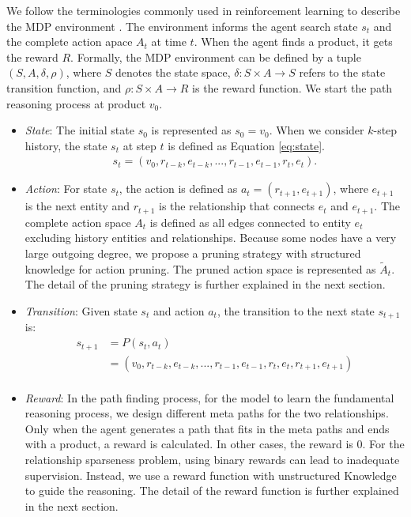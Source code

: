 \documentclass[review]{elsarticle}
\begin{document}
\begin{sloppypar}
We follow the terminologies commonly used in reinforcement learning to describe the MDP environment \cite{shani2005_mdp}.
The environment informs the agent search state $s_{t}$ and the complete action apace $A_{t}$ at time $t$.
When the agent finds a product, it gets the reward $R$. 
Formally, the MDP environment can be defined by a tuple $(S, A, \delta, \rho)$, where $S$ denotes the state space, $\delta:S \times A \rightarrow S$ refers to the state transition function, and $\rho: S \times A \rightarrow R$ is the reward function. We start the path reasoning process at product $v_{0}$.
\begin{itemize}
\item \emph{State}: The initial state $s_{0}$ is represented as $s_{0}=v_{0}$. When we consider $k$-step history, the state $s_{t}$ at step $t$ is defined as Equation \ref{eq:state}.
\begin{equation}\label{eq:state}
    \begin{aligned}
   s_{t}=(v_{0},r_{t-k},e_{t-k},...,r_{t-1},e_{t-1},r_{t},e_{t}).
\end{aligned}
\end{equation}
\item \emph{Action}: For state $s_{t}$, the action is defined as $a_{t}=(r_{t+1}, e_{t+1})$, where $e_{t+1}$ is the next entity and $r_{t+1}$ is the relationship that connects $e_{t}$ and $e_{t+1}$. The complete action space $A_{t}$ is defined as all edges connected to entity $e_{t}$ excluding history entities and relationships. 
Because some nodes have a very large outgoing degree, we propose a pruning strategy with structured knowledge for action pruning.
The pruned action space is represented as $\tilde{A}_{t}$. The detail of the pruning strategy is further explained in the next section.
\item \emph{Transition}:
Given state $s_{t}$ and action $a_{t}$, the transition to the next state $s_{t+1}$ is:
\begin{equation}\label{eq:transition}
    \begin{aligned}
    s_{t+1}&=P(s_{t},a_{t}) \\
    &=(v_{0},r_{t-k},e_{t-k},...,r_{t-1},e_{t-1},r_{t},e_{t},r_{t+1},e_{t+1})\\
\end{aligned}
\end{equation}

\item \emph{Reward}: 
In the path finding process, for the model to learn the fundamental reasoning process, we design different meta paths for the two relationships. Only when the agent generates a path that fits in the meta paths and ends with a product, a reward is calculated. In other cases, the reward is 0. For the relationship sparseness problem, using binary rewards can lead to inadequate supervision. Instead, we use a reward function with unstructured Knowledge to guide the reasoning. The detail of the reward function is further explained in the next section.
\end{itemize}

\end{sloppypar}
\end{document}
